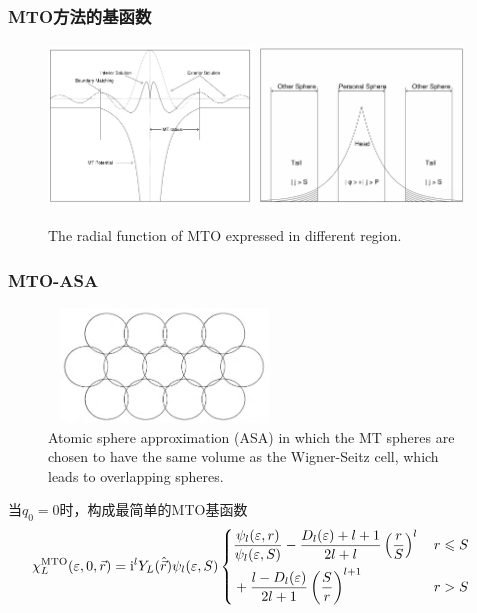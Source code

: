 \documentclass[cjk,slidestop,compress,mathserif,blue]{beamer}
\begin{document}
\frame
{
	\frametitle{\textrm{MTO}方法的基函数}
\begin{figure}[h!]
\centering
\includegraphics[height=1.70in,width=2.15in,viewport=0 0 845 635,clip]{Figures/MTO-envelope-1.png}
\includegraphics[height=1.70in,width=2.15in,viewport=0 0 885 635,clip]{Figures/MTO-envelope-2.png}
\caption{\small \textrm{The radial function of MTO expressed in different region.}}%
\label{MTO-envelope}
\end{figure}
}

\frame
{
	\frametitle{\textrm{MTO-ASA}}
\begin{figure}[h!]
	\vspace{-18pt}
\centering
\includegraphics[height=1.20in,width=2.42in,viewport=5 0 1005 495,clip]{Figures/Atomic_sphere-appro.png}
\caption{\small \textrm{Atomic sphere approximation (ASA) in which the MT spheres are chosen to have the same volume as the Wigner-Seitz cell, which leads to overlapping spheres.}}
\label{Atomic_sphere-appro}
\end{figure}
当$q_0=0$时，构成最简单的\textrm{MTO}基函数
		\begin{displaymath}
			\hspace*{-12pt}\chi_L^{\mathrm{MTO}}(\varepsilon,0,\vec r)=\mathrm{i}^lY_L(\hat{\vec r})\psi_l(\varepsilon,S)\left\{
			\begin{aligned}
				&\dfrac{\psi_l(\varepsilon,r)}{\psi_l(\varepsilon,S)}-\dfrac{D_l(\varepsilon)+l+1}{2l+l}\left(\dfrac rS\right)^l&\, r\leqslant S\\
				&+\dfrac{l-D_l(\varepsilon)}{2l+1}\left(\dfrac Sr\right)^{l+1}&\, r>S
			\end{aligned}\right.
		\end{displaymath}
}
\end{document}
